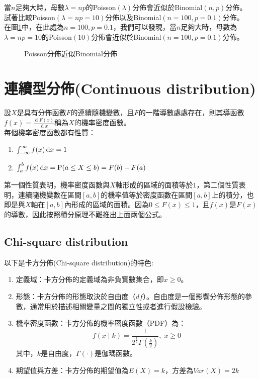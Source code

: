 \documentclass[12pt, a4paper]{article}
\begin{document}
當\;$n$\;足夠大時，母數\;$\lambda =np$\;的\;Poisson$(\lambda)$\;分佈會近似於\;Binomial$(n,p)$\;分佈。\\
試著比較\;Poisson$(\lambda=np=10)$\;分佈以及\;Binomial$(n=100,p=0.1)$\;分佈。\\
在圖\;\ref{fig:parallel3_8}\;中，在此處為\;$n=100,p=0.1$\;，我們可以發現，當\;$n$\;足夠大時，母數為\;$\lambda =np=10$\;的\;Poisson$(10)$\;分佈會近似於\;Binomial$(n=100,p=0.1)$\;分佈。

\begin{figure}[h]
\centering
{}
\caption{Poisson分佈近似Binomial分佈}
\label{fig:parallel3_8}
\end{figure}


\section{連續型分佈(Continuous distribution)}
設\;$X$\;是具有分佈函數\;$F$\;的連續隨機變數，且\;$F$\;的一階導數處處存在，則其導函數\;$f(x)={\frac {\operatorname {d} F(x)}{\operatorname {d} x}}$\;稱為\;$X$\;的機率密度函數。\\
每個機率密度函數都有性質：
\begin{enumerate}
\item $\int _{-\infty }^{\infty }f(x)\,{\rm {d}}x = 1$
\item $\int _{a}^{b} f(x)\,{\rm {d}}x=\operatorname {P} (a\leq X\leq b)=F(b)-F(a)$
\end{enumerate}
第一個性質表明，機率密度函數與\;$X$\;軸形成的區域的面積等於\;$1$\;，第二個性質表明，連續隨機變數在區間\;$[a,b]$\;的機率值等於密度函數在區間\;$[a,b]$\;上的積分，也即是與\;$X$\;軸在\;$[a,b]$\;內形成的區域的面積。因為\;$0\leq F(x)\leq 1$\;，且\;$f(x)$\;是\;$F(x)$\;的導數，因此按照積分原理不難推出上面兩個公式。

\subsection{Chi-square distribution}
以下是卡方分佈(Chi-square distribution)的特色\;:
\begin{enumerate}
\item 定義域：卡方分佈的定義域為非負實數集合，即\;$x\geq 0$\;。
\item 形態：卡方分佈的形態取決於自由度（\;$df$\;）。自由度是一個影響分佈形態的參數，通常用於描述相關變量之間的獨立性或者進行假設檢驗。
\item 機率密度函數：卡方分佈的機率密度函數（PDF）為：
$$f(x\mid k)=\frac{1}{2^{\frac{k}{2}} \Gamma({\frac{k}{2}})},\;x\geq 0$$ 
其中，\;$k$\;是自由度，\;$\Gamma(\cdot)$\;是伽瑪函數。
\item 期望值與方差：卡方分佈的期望值為\;$E(X)=k$\;，方差為\;$Var(X)=2k$\;
\end{enumerate}
\end{document}
